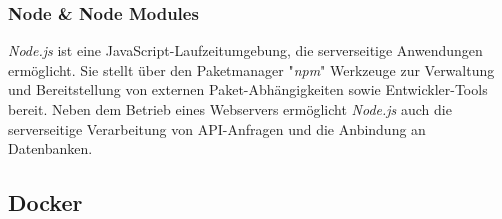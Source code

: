 \subsubsection{Node \& Node Modules}

\textit{Node.js} ist eine JavaScript-Laufzeitumgebung, die serverseitige Anwendungen ermöglicht. Sie stellt über den Paketmanager "\textit{npm}" Werkzeuge zur Verwaltung und Bereitstellung von externen Paket-Abhängigkeiten sowie Entwickler-Tools bereit. Neben dem Betrieb eines Webservers ermöglicht \textit{Node.js} auch die serverseitige Verarbeitung von API-Anfragen und die Anbindung an Datenbanken.

\subsection{Docker} \label{cha:grundlagen:swtech:docker}